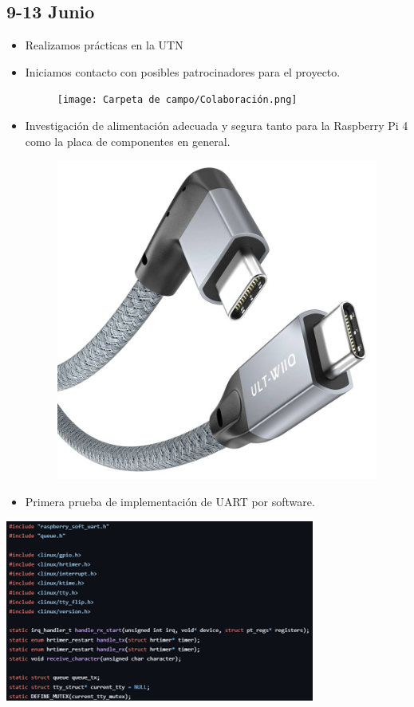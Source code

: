\documentclass[12pt,a4paper]{article}
\begin{document}
\subsection*{9-13 Junio}
\begin{itemize}

\item Realizamos prácticas en la UTN 
\item Iniciamos contacto con posibles patrocinadores para el proyecto.

\begin{figure}[H]
    \centering
    \texttt{[image: Carpeta de campo/Colaboración.png]}

\end{figure}

\item Investigación de alimentación adecuada y segura tanto para la Raspberry Pi 4 como la placa de componentes en general.

\begin{figure}[H]
    \centering
    \includegraphics[width=0.5\linewidth]{Carpeta de campo/Cable usb c.png}
\end{figure}

\item Primera prueba de implementación de UART por software.

\end{itemize}

\includegraphics[width=0.6\linewidth]{Carpeta de campo/Imagen12.png}
\end{document}
